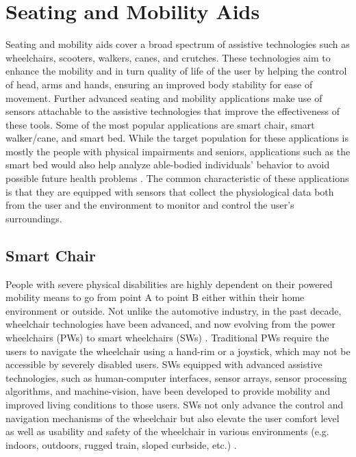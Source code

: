 \section{Seating and Mobility Aids}

Seating and mobility aids cover a broad spectrum of assistive technologies such as wheelchairs, scooters, walkers, canes, and crutches. These technologies aim to enhance the mobility and in turn quality of life of the user by helping the control of head, arms and hands, ensuring an improved body stability for ease of movement. Further advanced seating and mobility applications make use of sensors attachable to the assistive technologies that improve the effectiveness of these tools. Some of the most popular applications are smart chair, smart walker/cane, and smart bed. While the target population for these applications is mostly the people with physical impairments and seniors, applications such as the smart bed would also help analyze able-bodied individuals' behavior to avoid possible future health problems \citep{laurino_smart_2020,su_monitoring_2019}. The common characteristic of these applications is that they are equipped with sensors that collect the physiological data both from the user and the environment to monitor and control the user's surroundings. \\

\subsection{Smart Chair}

People with severe physical disabilities are highly dependent on their powered mobility means to go from point A to point B either within their home environment or outside. Not unlike the automotive industry, in the past decade, wheelchair technologies have been advanced, and now evolving from the power wheelchairs (PWs) to smart wheelchairs (SWs) \parencite{leaman_comprehensive_2017}. Traditional PWs require the users to navigate the wheelchair using a hand-rim or a joystick, which may not be accessible by severely disabled users. SWs equipped with advanced assistive technologies, such as human-computer interfaces, sensor arrays, sensor processing algorithms, and machine-vision, have been developed to provide mobility and improved living conditions to those users. SWs not only advance the control and navigation mechanisms of the wheelchair but also elevate the user comfort level as well as usability and safety of the wheelchair in various environments (e.g. indoors, outdoors, rugged train, sloped curbside, etc.) \parencite{ahmad_screen-printed_2019,hu_smart_2020,tavares_wheelchair_2020}.

